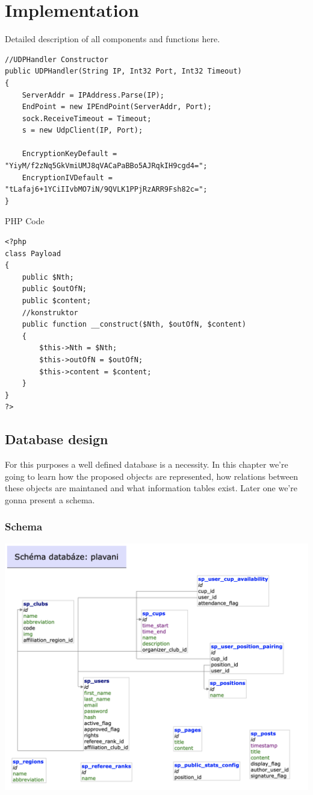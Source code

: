 \chapter{Implementation}
Detailed description of all components and  functions here.  
\begin{lstlisting}
//UDPHandler Constructor 
public UDPHandler(String IP, Int32 Port, Int32 Timeout)
{
    ServerAddr = IPAddress.Parse(IP);
    EndPoint = new IPEndPoint(ServerAddr, Port);
    sock.ReceiveTimeout = Timeout;
    s = new UdpClient(IP, Port);
    
    EncryptionKeyDefault = "YiyM/f2zNq5GkVmiUMJ8qVACaPaBBo5AJRqkIH9cgd4=";
    EncryptionIVDefault = "tLafaj6+1YCiIIvbMO7iN/9QVLK1PPjRzARR9Fsh82c=";
}
\end{lstlisting}
PHP Code
\begin{lstlisting}
<?php
class Payload
{
    public $Nth;
    public $outOfN;
    public $content;
    //konstruktor
    public function __construct($Nth, $outOfN, $content)
    {
        $this->Nth = $Nth;
        $this->outOfN = $outOfN;
        $this->content = $content;
    }
}
?>
\end{lstlisting}

\section{Database design}
For this purposes a well defined database is a necessity. In this chapter we're going to learn how the proposed objects are represented, how relations between these objects are maintaned and what information tables exist. Later one we're gonna present a schema.
\subsection{Schema}
\includegraphics[scale=0.45]{img/schema.png}
